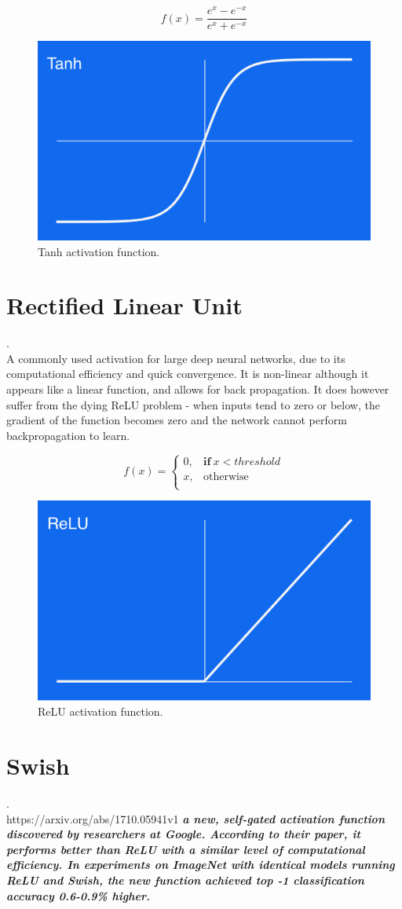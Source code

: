 \begin{equation}
    f(x) = \frac {e^x - e^{-x}} {e^x + e^{-x}}
\end{equation}
\begin{figure}[H]
\centering
\includegraphics[width=.265\textwidth]{4fig/tanh.png}
\caption{Tanh activation function.}
\end{figure}


\section{Rectified Linear Unit}.\\
A commonly used activation for large deep neural networks, due to its computational efficiency and quick convergence. It is non-linear although it appears like a linear function, and allows for back propagation. It does however suffer from the dying ReLU problem - when inputs tend to zero or below, the gradient of the function becomes zero and the network cannot perform backpropagation to learn.

\begin{equation}
f(x) =
    \begin{cases}
      0 , & \mathbf{if} \ x < threshold \\
      x , & \text{otherwise}\\
    \end{cases}
  \end{equation}
\begin{figure}[H]
\centering
\includegraphics[width=.265\textwidth]{4fig/relu.png}
\caption{ReLU activation function.}
\end{figure}



\section{Swish}.\\
https://arxiv.org/abs/1710.05941v1
\textbf{\textit{a new, self-gated activation function discovered by researchers at Google. According to their paper, it performs better than ReLU with a similar level of computational efficiency. In experiments on ImageNet with identical models running ReLU and Swish, the new function achieved top -1 classification accuracy 0.6-0.9\% higher.}}

